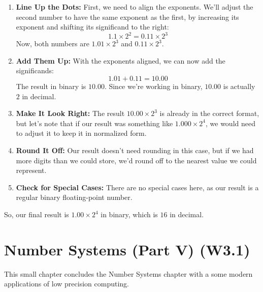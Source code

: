 \documentclass[12pt,openany]{book}
\begin{document}
			      	\begin{enumerate}
			      		\item \textbf{Line Up the Dots:} First, we need to align the exponents. We'll adjust the second number to have the same exponent as the first, by increasing its exponent and shifting its significand to the right: 
			      		      \[
			      		      	1.1 \times 2^2 = 0.11 \times 2^3
			      		      \]
			      		      Now, both numbers are $1.01 \times 2^3$ and $0.11 \times 2^3$.
			      		      
			      		\item \textbf{Add Them Up:} With the exponents aligned, we can now add the significands:
			      		      \[
			      		      	1.01 + 0.11 = 10.00
			      		      \]
			      		      The result in binary is $10.00$. Since we're working in binary, $10.00$ is actually $2$ in decimal. 
			      		      
			      		\item \textbf{Make It Look Right:} The result $10.00 \times 2^3$ is already in the correct format, but let's note that if our result was something like $1.000 \times 2^4$, we would need to adjust it to keep it in normalized form.
			      		      
			      		\item \textbf{Round It Off:} Our result doesn't need rounding in this case, but if we had more digits than we could store, we'd round off to the nearest value we could represent.
			      		      
			      		\item \textbf{Check for Special Cases:} There are no special cases here, as our result is a regular binary floating-point number.
			      	\end{enumerate}
			      	
			      	So, our final result is $1.00 \times 2^4$ in binary, which is $16$ in decimal.
			      	
			      	
			      	\chapter{Number Systems (Part V) (W3.1)}
			      	
			      	
			      	
			      	
			      	\begin{text}
			      		This small chapter concludes the Number Systems chapter with a some modern applications of low precision computing.
			      	\end{text}
\end{document}
